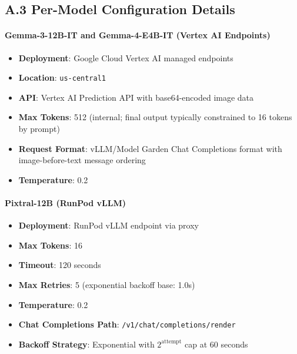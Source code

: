 \subsection*{A.3 Per-Model Configuration Details}

\paragraph{Gemma-3-12B-IT and Gemma-4-E4B-IT (Vertex AI Endpoints)}
\begin{itemize}
    \item \textbf{Deployment}: Google Cloud Vertex AI managed endpoints
    \item \textbf{Location}: \texttt{us-central1}
    \item \textbf{API}: Vertex AI Prediction API with base64-encoded image data
    \item \textbf{Max Tokens}: 512 (internal; final output typically constrained to 16 tokens by prompt)
    \item \textbf{Request Format}: vLLM/Model Garden Chat Completions format with image-before-text message ordering
    \item \textbf{Temperature}: 0.2
\end{itemize}

\paragraph{Pixtral-12B (RunPod vLLM)}
\begin{itemize}
    \item \textbf{Deployment}: RunPod vLLM endpoint via proxy
    \item \textbf{Max Tokens}: 16
    \item \textbf{Timeout}: 120 seconds
    \item \textbf{Max Retries}: 5 (exponential backoff base: 1.0s)
    \item \textbf{Temperature}: 0.2
    \item \textbf{Chat Completions Path}: \texttt{/v1/chat/completions/render}
    \item \textbf{Backoff Strategy}: Exponential with $2^{\text{attempt}}$ cap at 60 seconds
\end{itemize}

